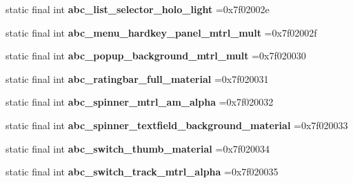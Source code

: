 \begin{DoxyCompactItemize}
\item 
\hypertarget{classcheck_1_1test_1_1_r_1_1drawable_a3f05e7be3f090cb66c9c8e26ef04022a}{}static final int {\bfseries abc\+\_\+list\+\_\+selector\+\_\+holo\+\_\+light} =0x7f02002e\label{classcheck_1_1test_1_1_r_1_1drawable_a3f05e7be3f090cb66c9c8e26ef04022a}

\item 
\hypertarget{classcheck_1_1test_1_1_r_1_1drawable_aeb48819d0a22b2c84e1284875e695a31}{}static final int {\bfseries abc\+\_\+menu\+\_\+hardkey\+\_\+panel\+\_\+mtrl\+\_\+mult} =0x7f02002f\label{classcheck_1_1test_1_1_r_1_1drawable_aeb48819d0a22b2c84e1284875e695a31}

\item 
\hypertarget{classcheck_1_1test_1_1_r_1_1drawable_acba43189b4d5b8970ed5c41a9502de61}{}static final int {\bfseries abc\+\_\+popup\+\_\+background\+\_\+mtrl\+\_\+mult} =0x7f020030\label{classcheck_1_1test_1_1_r_1_1drawable_acba43189b4d5b8970ed5c41a9502de61}

\item 
\hypertarget{classcheck_1_1test_1_1_r_1_1drawable_a532e839ca23df2043a43e3b39048bd4f}{}static final int {\bfseries abc\+\_\+ratingbar\+\_\+full\+\_\+material} =0x7f020031\label{classcheck_1_1test_1_1_r_1_1drawable_a532e839ca23df2043a43e3b39048bd4f}

\item 
\hypertarget{classcheck_1_1test_1_1_r_1_1drawable_a04ea3cb92454d069b93ede16af729223}{}static final int {\bfseries abc\+\_\+spinner\+\_\+mtrl\+\_\+am\+\_\+alpha} =0x7f020032\label{classcheck_1_1test_1_1_r_1_1drawable_a04ea3cb92454d069b93ede16af729223}

\item 
\hypertarget{classcheck_1_1test_1_1_r_1_1drawable_a25b4f983839d47237a90d34ff3d14414}{}static final int {\bfseries abc\+\_\+spinner\+\_\+textfield\+\_\+background\+\_\+material} =0x7f020033\label{classcheck_1_1test_1_1_r_1_1drawable_a25b4f983839d47237a90d34ff3d14414}

\item 
\hypertarget{classcheck_1_1test_1_1_r_1_1drawable_acefaba62b827c67ce2074013b2d368ea}{}static final int {\bfseries abc\+\_\+switch\+\_\+thumb\+\_\+material} =0x7f020034\label{classcheck_1_1test_1_1_r_1_1drawable_acefaba62b827c67ce2074013b2d368ea}

\item 
\hypertarget{classcheck_1_1test_1_1_r_1_1drawable_a4bba48e4b1088df98a267872390fccfb}{}static final int {\bfseries abc\+\_\+switch\+\_\+track\+\_\+mtrl\+\_\+alpha} =0x7f020035\label{classcheck_1_1test_1_1_r_1_1drawable_a4bba48e4b1088df98a267872390fccfb}


\end{DoxyCompactItemize}
